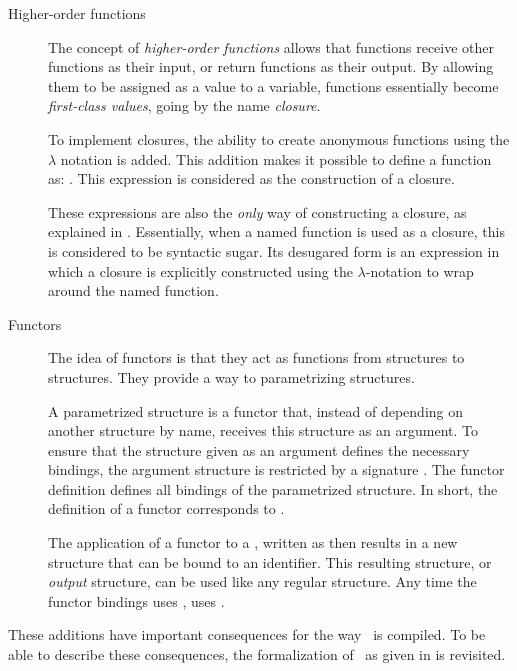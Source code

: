 \begin{description}
\item[Higher-order functions]
The concept of \emph{higher-order functions} allows that functions receive other functions as their input, or return functions as their output.
By allowing them to be assigned as a value to a variable, functions essentially become \emph{first-class values}, going by the name \emph{closure}.

To implement closures, the ability to create anonymous functions using the $\lambda$ notation is added.
This addition makes it possible to define a function as: .
This expression is considered as the construction of a closure.

These expressions are also the \emph{only} way of constructing a closure, as explained in . 
Essentially, when a named function is used as a closure, this is considered to be syntactic sugar.
Its desugared form is an expression in which a closure is explicitly constructed using the $\lambda$-notation to wrap around the named function.

\item[Functors]
The idea of functors is that they act as functions from structures to structures.
They provide a way to parametrizing structures.

A parametrized structure is a functor  that, instead of depending on another structure  by name, receives this structure as an argument.
To ensure that the structure given as an argument defines the necessary bindings, the argument structure is restricted by a signature .
The functor definition defines all bindings of the parametrized structure.
In short, the definition of a functor corresponds to .

The application of a functor  to a , written as  then results in a new structure  that can be bound to an identifier.
This resulting structure, or \emph{output} structure, can be used like any regular structure. Any time the functor bindings uses ,  uses .
\end{description}

These additions have important consequences for the way \MiniML\ is compiled.
To be able to describe these consequences, the formalization of \MiniML\ as given in  is revisited.

